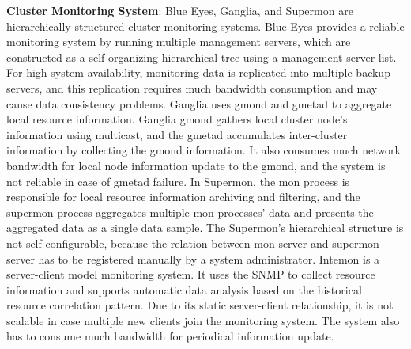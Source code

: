 \documentclass{acm_proc_article-sp}
\begin{document}
\textbf{Cluster Monitoring System}: Blue Eyes\cite{blueeyes}, Ganglia\cite{ganglia}, and Supermon\cite{supermon} are hierarchically structured cluster monitoring systems. 
Blue Eyes\cite{blueeyes} provides a reliable monitoring system by running multiple management servers, which are constructed as a self-organizing hierarchical tree using a management server list. 
For high system availability, monitoring data is replicated into multiple backup servers, and this replication requires much bandwidth consumption and may cause data consistency problems.
Ganglia\cite{ganglia} uses gmond and gmetad to aggregate local resource information. 
Ganglia gmond gathers local cluster node's information using multicast, and the gmetad accumulates inter-cluster information by collecting the gmond information.
It also consumes much network bandwidth for local node information update to the gmond, and the system is not reliable in case of gmetad failure.
In Supermon\cite{supermon}, the mon process is responsible for local resource information archiving and filtering, 
and the supermon process aggregates multiple mon processes' data and presents the aggregated data as a single data sample. 
The Supermon's hierarchical structure is not self-configurable, because the relation between mon server and supermon server has to be registered manually by a system administrator.
Intemon\cite{intemon} is a server-client model monitoring system. It uses the SNMP to collect resource information and supports automatic data analysis based on the historical resource correlation pattern.
Due to its static server-client relationship, it is not scalable in case multiple new clients join the monitoring system. The system also has to consume much bandwidth for periodical information update.
\end{document}
